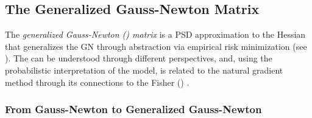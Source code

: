 \subsection{The Generalized Gauss-Newton Matrix}\label{sec:background::ggn}

The \emph{generalized Gauss-Newton (\ggn) matrix} is a PSD approximation to the
Hessian that generalizes the GN through abstraction via empirical risk
minimization (see ). The \ggn
can be understood through different perspectives, and, using the probabilistic
interpretation of the model, is related to the natural gradient method through
its connections to the Fisher () .

\subsubsection{From Gauss-Newton to Generalized Gauss-Newton}

